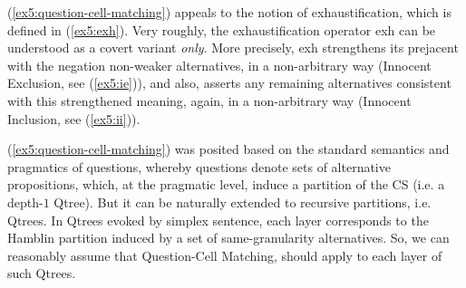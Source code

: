 (\ref{ex5:question-cell-matching}) appeals to the notion of exhaustification, which is defined in (\ref{ex5:exh}). Very roughly, the exhaustification operator exh can be understood as a covert variant \textit{only}. More precisely, exh strengthens its prejacent with the negation non-weaker alternatives, in a non-arbitrary way (Innocent Exclusion, see (\ref{ex5:ie})), and also, asserts any remaining alternatives consistent with this strengthened meaning, again, in a non-arbitrary way (Innocent Inclusion, see (\ref{ex5:ii})).
\begin{exe}
	\label{ex5:exh}
	\begin{xlist}
		\label{ex5:ie}
		\label{ex5:ii}
	\end{xlist}
\end{exe}

(\ref{ex5:question-cell-matching}) was posited based on the standard semantics and pragmatics of questions, whereby questions denote sets of alternative propositions, which, at the pragmatic level, induce a partition of the CS (i.e. a depth-$1$ Qtree). But it can be naturally extended to recursive partitions, i.e. Qtrees. In Qtrees evoked by simplex sentence, each layer corresponds to the Hamblin partition induced by a set of same-granularity alternatives. So, we can reasonably assume that Question-Cell Matching, should apply to each layer of such Qtrees.

